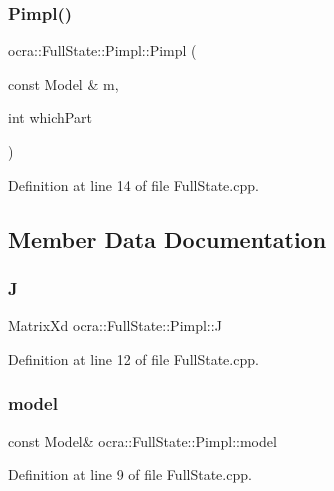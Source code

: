 \subsubsection{\texorpdfstring{Pimpl()}{Pimpl()}}
{\footnotesize\ttfamily ocra\+::\+Full\+State\+::\+Pimpl\+::\+Pimpl (\begin{DoxyParamCaption}\item[{const Model \&}]{m,  }\item[{int}]{which\+Part }\end{DoxyParamCaption})\hspace{0.3cm}{\ttfamily [inline]}}



Definition at line 14 of file Full\+State.\+cpp.



\subsection{Member Data Documentation}
\hypertarget{structocra_1_1FullState_1_1Pimpl_a150f47fa013614729e1e6aedf141523f}{}\label{structocra_1_1FullState_1_1Pimpl_a150f47fa013614729e1e6aedf141523f} 
\subsubsection{\texorpdfstring{J}{J}}
{\footnotesize\ttfamily Matrix\+Xd ocra\+::\+Full\+State\+::\+Pimpl\+::J}



Definition at line 12 of file Full\+State.\+cpp.

\hypertarget{structocra_1_1FullState_1_1Pimpl_ac8e2409d7e4a099fdb6fc3ef9c7d3026}{}\label{structocra_1_1FullState_1_1Pimpl_ac8e2409d7e4a099fdb6fc3ef9c7d3026} 
\subsubsection{\texorpdfstring{model}{model}}
{\footnotesize\ttfamily const Model\& ocra\+::\+Full\+State\+::\+Pimpl\+::model}



Definition at line 9 of file Full\+State.\+cpp.

\hypertarget{structocra_1_1FullState_1_1Pimpl_ab10f6e199d008d84731024cb80772a5d}{}\label{structocra_1_1FullState_1_1Pimpl_ab10f6e199d008d84731024cb80772a5d} 

